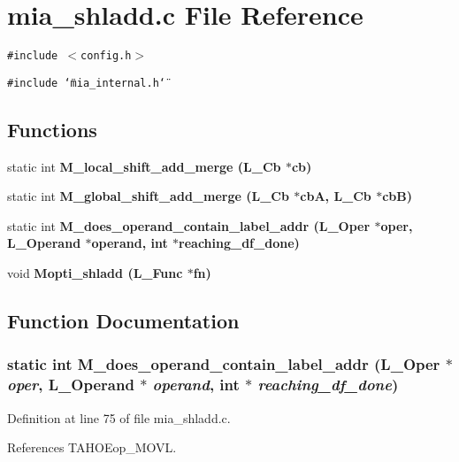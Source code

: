 \section{mia\_\-shladd.c File Reference}
\label{mia__shladd_8c}
{\tt \#include $<$config.h$>$}\par
{\tt \#include \char`\"{}mia\_\-internal.h\char`\"{}}\par
\subsection*{Functions}
\begin{CompactItemize}
\item 
static int \bf{M\_\-local\_\-shift\_\-add\_\-merge} (L\_\-Cb $\ast$cb)
\item 
static int \bf{M\_\-global\_\-shift\_\-add\_\-merge} (L\_\-Cb $\ast$cb\-A, L\_\-Cb $\ast$cb\-B)
\item 
static int \bf{M\_\-does\_\-operand\_\-contain\_\-label\_\-addr} (L\_\-Oper $\ast$oper, L\_\-Operand $\ast$operand, int $\ast$reaching\_\-df\_\-done)
\item 
void \bf{Mopti\_\-shladd} (L\_\-Func $\ast$fn)
\end{CompactItemize}


\subsection{Function Documentation}
\subsubsection{\setlength{\rightskip}{0pt plus 5cm}static int M\_\-does\_\-operand\_\-contain\_\-label\_\-addr (L\_\-Oper $\ast$ {\em oper}, L\_\-Operand $\ast$ {\em operand}, int $\ast$ {\em reaching\_\-df\_\-done})\hspace{0.3cm}{\tt  [static]}}\label{mia__shladd_8c_b9a272e9168c70ced2c1e3b833b4ca26}




Definition at line 75 of file mia\_\-shladd.c.

References TAHOEop\_\-MOVL.
